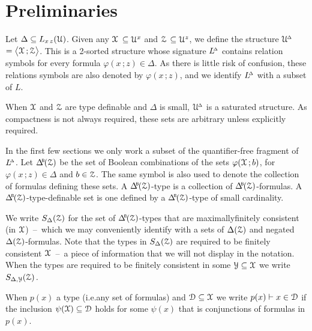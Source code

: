\section{Preliminaries}
\label{actions}

\def\ceq#1#2#3{\noindent\parbox[t]{15ex}{$\displaystyle #1$}\parbox{6ex}{\hfil $#2$}{$\displaystyle #3$}}


Let $\Delta\subseteq L_{x\,z}(\EuScript U)$.
Given any \emph{$\EuScript X$\/} $\subseteq\EuScript U^x$ and \emph{$\EuScript Z$\/} $\subseteq\EuScript U^z$, we define the structure \emph{$\EuScript U\kern-.2ex^{\scriptscriptstyle\Delta}$\/} $=\big\langle\EuScript X\,;\EuScript Z\big\rangle$.
This is a 2-sorted structure whose signature \emph{$L\kern-.4ex^{\scriptscriptstyle\Delta}$\/} contains relation symbols for every formula $\varphi(x\,;z)\in\Delta$.
As there is little risk of confusion, these relations symbols are also denoted by $\varphi(x\,;z)$, and we identify $L\kern-.4ex^{\scriptscriptstyle\Delta}$ with a subset of $L$.

When $\EuScript X$ and $\EuScript Z$ are type definable and $\Delta$ is small, $\EuScript U\kern-.2ex^{\scriptscriptstyle\Delta}$ is a saturated structure.
As compactness is not always required, these sets are arbitrary unless explicitly required.

In the first few sections we only work a subset of the quantifier-free fragment of $L\kern-.4ex^{\scriptscriptstyle\Delta}$.
Let $\BDelta(\Z)$ be the set of Boolean combinations of the sets $\varphi(\EuScript X\,;b)$, for $\varphi(x\,;z)\in\Delta$ and $b\in\EuScript Z$.
The same symbol is also used to denote the collection of formulas defining these sets.
A $\BDelta(\Z)$-type is a collection of $\BDelta(\Z)$-formulas.
A $\BDelta(\Z)$-type-definable set is one defined by a $\BDelta(\Z)$-type of small cardinality.

We write \emph{$S_\Delta(\EuScript Z)$\/} for the set of $\BDelta(\Z)$-types that are maximallyfinitely consistent (in $\EuScript X$)~--~which we may conveniently identify with a sets of $\Delta(\EuScript Z)$ and negated $\Delta(\EuScript Z)$-formulas.
Note that the types in $S_\Delta(\EuScript Z)$ are required to be finitely consistent $\EuScript X$~--~a piece of information that we will not display in the notation.
When the types are required to be finitely consistent in some $\EuScript Y\subseteq\EuScript X$ we write \emph{$S_{\Delta,\EuScript Y}(\EuScript Z)$.}


When $p(x)$ a type (i.e.\@ any set of formulas) and $\EuScript D\subseteq\EuScript X$ we write $p(x)\vdash x\in{\EuScript D}$ if the inclusion $\psi(\EuScript X)\subseteq{\EuScript D}$ holds for some $\psi(x)$ that is conjunctions of formulas in $p(x)$.

